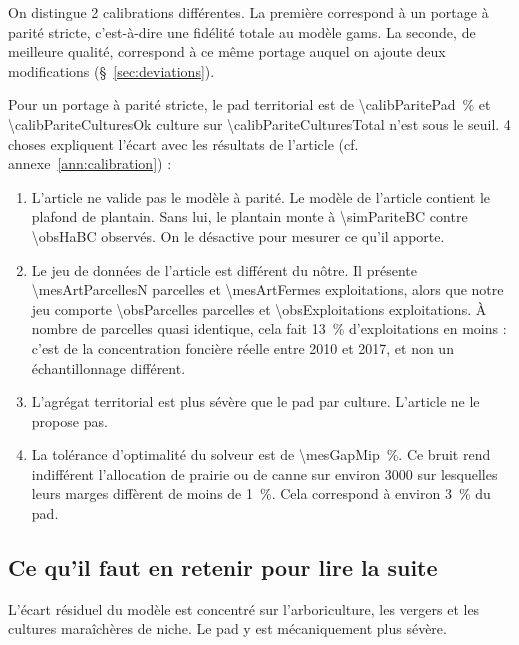 On distingue \num{2} calibrations différentes. La première correspond à un portage à parité
stricte, c'est-à-dire une fidélité totale au modèle \gls{gams}. La seconde, de meilleure qualité,
correspond à ce même portage auquel on ajoute deux modifications (§~\ref{sec:deviations}).

Pour un portage à parité stricte, le \gls{pad} territorial est de
\SI{\calibParitePad}{\percent} et \num{\calibPariteCulturesOk} culture sur
\num{\calibPariteCulturesTotal} n'est sous le seuil. \num{4} choses expliquent l'écart avec les
résultats de l'article (cf. annexe~\ref{ann:calibration}) :

\begin{enumerate}[leftmargin=1.6em,itemsep=6pt]

\item L'article ne valide pas le modèle à parité. Le modèle de l'article contient le plafond de
  plantain. Sans lui, le plantain monte à \SI{\simPariteBC}{\ha} contre \SI{\obsHaBC}{\ha}
  observés. On le désactive pour mesurer ce qu'il apporte.

\item Le jeu de données de l'article est différent du nôtre. Il présente
  \num{\mesArtParcellesN} parcelles et \num{\mesArtFermes} exploitations, alors que notre jeu
  comporte \num{\obsParcelles} parcelles et \num{\obsExploitations} exploitations. À nombre de
  parcelles quasi identique, cela fait \SI{13}{\percent} d'exploitations en moins : c'est de la
  concentration foncière réelle entre 2010 et 2017, et non un échantillonnage différent.

\item L'agrégat territorial est plus sévère que le \gls{pad} par culture. L'article ne le
  propose pas.

\item La tolérance d'optimalité du solveur est de \SI{\mesGapMip}{\percent}. Ce bruit rend
  indifférent l'allocation de prairie ou de canne sur environ \SI{3000}{\ha} sur lesquelles
  leurs marges diffèrent de moins de \SI{1}{\percent}. Cela correspond à environ
  \SI{3}{\percent} du \gls{pad}.

\end{enumerate}

\subsection*{Ce qu'il faut en retenir pour lire la suite}

L'écart résiduel du modèle est concentré sur l'arboriculture, les vergers et les cultures
maraîchères de niche. Le \gls{pad} y est mécaniquement plus sévère.


